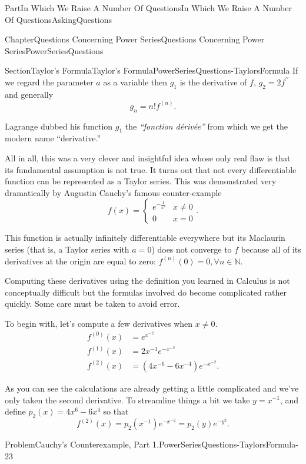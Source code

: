 \documentclass[oneside,10pt,]{book}
\numberwithin{equation}{part}
\newcommand{\NN}{\mathbb {N}}
\newcommand{\amp}{&}
\begin{document}
\begin{partptx}{Part}{In Which We Raise A Number Of Questions}{}{In Which We Raise A Number Of Questions}{}{}{AskingQuestions}
\begin{chapterptx}{Chapter}{Questions Concerning Power Series}{}{Questions Concerning Power Series}{}{}{PowerSeriesQuestions}
\begin{sectionptx}{Section}{Taylor's Formula}{}{Taylor's Formula}{}{}{PowerSeriesQuestions-TaylorsFormula}
If we regard the parameter \(a\) as a variable then \(g_1\) is the derivative of \(f\), \(g_2=2f^{\prime\prime}\) and generally%
\begin{equation*}
g_n=n!f^{(n)}\text{.}
\end{equation*}
%
\par
Lagrange dubbed his function \(g_1\) the \textit{``fonction dérivée''} from which we get the modern name ``derivative.''%
\par
All in all, this was a very clever and insightful idea whose only real flaw is that its fundamental assumption is not true. It turns out that not every differentiable function can be represented as a Taylor series. This was demonstrated very dramatically by Augustin Cauchy's famous counter-example%
\begin{equation}
f(x) = \begin{cases} e^{-\frac{1}{x^2}}\amp  x\ne0\\ 0 \amp x=0 \end{cases}\text{.}\label{eq_CauchyCounterEx}
\end{equation}
%
\par
This function is actually infinitely differentiable everywhere but its Maclaurin series (that is, a Taylor series with \(a=0\)) does not converge to \(f\) because all of its derivatives at the origin are equal to zero: \(f^{(n)}(0) = 0, \forall n\in\NN\).%
\par
Computing these derivatives using the definition you learned in Calculus is not conceptually difficult but the formulas involved do become complicated rather quickly. Some care must be taken to avoid error.%
\par
To begin with, let's compute a few derivatives when \(x \neq 0\).%
\begin{align*}
f^{(0)}(x) \amp = e^{x^{-2}}\\
f^{(1)}(x) \amp = 2x^{-3}e^{-x^{-2}}\\
f^{(2)}(x) \amp = \left(4x^{-6}-6x^{-4}\right)e^{-x^{-2}}\text{.}
\end{align*}
%
\par
As you can see the calculations are already getting a little complicated and we've only taken the second derivative. To streamline things a bit we take \(y= x^{-1}\), and define \(p_2(x) = 4x^6-6x^4\) so that%
\begin{equation*}
f^{(2)}(x) = p_2(x^{-1})e^{-x^{-2}} = p_2(y)e^{-y^2}\text{.}
\end{equation*}
%
\begin{problem}{Problem}{Cauchy's Counterexample, Part 1.}{PowerSeriesQuestions-TaylorsFormula-23}%

\end{problem}
\end{sectionptx}
\end{chapterptx}
\end{partptx}
\end{document}
